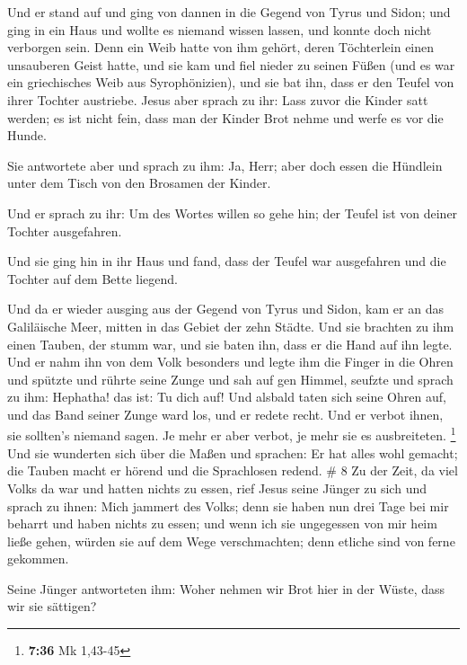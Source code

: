  Und er stand auf und ging von dannen in die Gegend von
Tyrus und Sidon; und ging in ein Haus und wollte es niemand wissen
lassen, und konnte doch nicht verborgen sein.  Denn ein
Weib hatte von ihm gehört, deren Töchterlein einen unsauberen Geist
hatte, und sie kam und fiel nieder zu seinen Füßen  (und es
war ein griechisches Weib aus Syrophönizien), und sie bat ihn, dass er
den Teufel von ihrer Tochter austriebe.  Jesus aber sprach
zu ihr: Lass zuvor die Kinder satt werden; es ist nicht fein, dass man
der Kinder Brot nehme und werfe es vor die Hunde.

 Sie antwortete aber und sprach zu ihm: Ja, Herr; aber doch
essen die Hündlein unter dem Tisch von den Brosamen der Kinder.

 Und er sprach zu ihr: Um des Wortes willen so gehe hin;
der Teufel ist von deiner Tochter ausgefahren.

 Und sie ging hin in ihr Haus und fand, dass der Teufel war
ausgefahren und die Tochter auf dem Bette liegend.

 Und da er wieder ausging aus der Gegend von Tyrus und
Sidon, kam er an das Galiläische Meer, mitten in das Gebiet der zehn
Städte.  Und sie brachten zu ihm einen Tauben, der stumm
war, und sie baten ihn, dass er die Hand auf ihn legte. 
Und er nahm ihn von dem Volk besonders und legte ihm die Finger in die
Ohren und spützte und rührte seine Zunge  und sah auf gen
Himmel, seufzte und sprach zu ihm: Hephatha! das ist: Tu dich auf!
 Und alsbald taten sich seine Ohren auf, und das Band
seiner Zunge ward los, und er redete recht.  Und er verbot
ihnen, sie sollten's niemand sagen. Je mehr er aber verbot, je mehr sie
es ausbreiteten. \footnote{\textbf{7:36} Mk 1,43-45}  Und
sie wunderten sich über die Maßen und sprachen: Er hat alles wohl
gemacht; die Tauben macht er hörend und die Sprachlosen redend. \# 8
 Zu der Zeit, da viel Volks da war und hatten nichts zu
essen, rief Jesus seine Jünger zu sich und sprach zu ihnen: 
Mich jammert des Volks; denn sie haben nun drei Tage bei mir beharrt und
haben nichts zu essen;  und wenn ich sie ungegessen von mir
heim ließe gehen, würden sie auf dem Wege verschmachten; denn etliche
sind von ferne gekommen.

 Seine Jünger antworteten ihm: Woher nehmen wir Brot hier in
der Wüste, dass wir sie sättigen?

